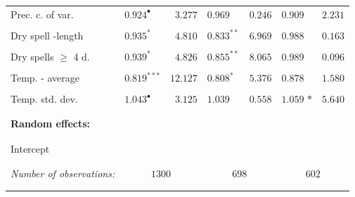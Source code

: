 \documentclass[12pt]{iopart}
\begin{document}
\begin{itemize}
{\begin{threeparttable}
\begin{footnotesize}
\begin{tabular}{llrlllr}
    \\ \vspace{-0.2cm}Prec. c. of var.&$0.924^{\bullet}$&$3.277$&$0.969$ &$0.246$&$0.909^{}$&$2.231$\\
  \\  \vspace{-0.2cm}Dry spell -length&$0.935^{*}$&$4.810$&$0.833^{**}$&$6.969$&$ 0.988^{}$&$0.163$\\
  \\ \vspace{-0.2cm}Dry spells 	$\geq$ 4 d.&$0.939^{*}$&$4.826$&$0.855^{**}$&$8.065$&$0.989^{}$&$0.096$\\
  \\ \vspace{-0.2cm}Temp. - average&$0.819^{***}$&$12.127$&$0.808^{*}$&$5.376$&$0.878$ $^{}$&$1.580$\\
  \\  \vspace{-0.2cm}Temp. std. dev.&$1.043^{\bullet}$&$3.125$&$1.039$&$0.558$&$1.059$ ${*}$&$5.640$\\
  \\
  \hline
\vspace{-0.2cm} \\
  \multicolumn{1}{l}{\textbf{Random effects:}}  & \\
\vspace{-0.2cm}
\\
\hline
\\
  \vspace{-0.2cm}Intercept\\
 \\ 
 \hline
\vspace{-0.2cm} \\
\textit{Number of observations:}  &\multicolumn{2}{c}{$1300$}&\multicolumn{2}{c}{$698$}&\multicolumn{2}{c}{$602$}\\
\vspace{-0.2cm}
\\  
  
  \hline
  \vspace{-0.2cm} \\


\end{tabular}
\end{footnotesize}
\end{threeparttable}}
\end{itemize}
\end{document}
